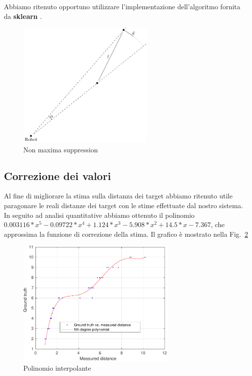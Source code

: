 \documentclass[a4paper]{article}
\begin{document}
	Abbiamo ritenuto opportuno utilizzare l'implementazione dell'algoritmo
	fornita da \textbf{sklearn} \cite{scikit}.
	
	\begin{figure}[H]
		\centering
		\includegraphics[width=0.6\textwidth]{./img/nms.pdf}
		\caption{Non maxima suppression}
		\label{fig:nms}
	\end{figure}
	
	\newpage
	
	\subsection{Correzione dei valori}\label{subsec:Correzione-dei-valori}
	Al fine di migliorare la stima sulla distanza dei target abbiamo ritenuto
	utile paragonare le reali distanze dei target con le stime effettuate dal
	nostro sistema. In seguito ad analisi quantitative abbiamo ottenuto il
	polinomio 	$0.003116*x^5 - 0.09722*x^4 + 1.124*x^3 -5.908*x^2 +
	14.5*x-7.367$,  che approssima la funzione di correzione della stima. Il
	grafico è mostrato nella Fig.~\ref{fig:interpolation}
	
	\begin{figure}[H]
		\centering
		\includegraphics[width=0.7\textwidth]{./img/interpolation.pdf}
		\caption{Polinomio interpolante}
		\label{fig:interpolation}
	\end{figure}
\end{document}
